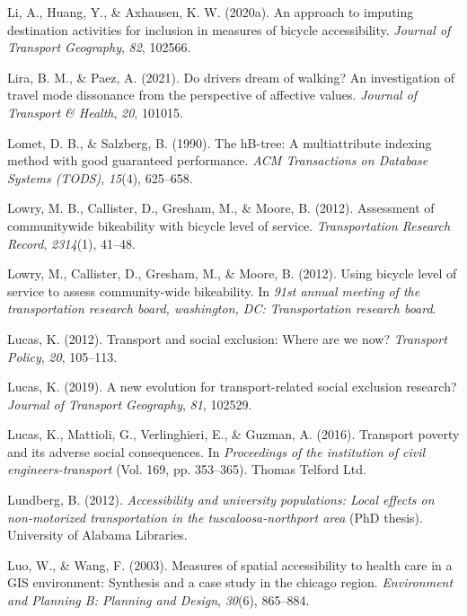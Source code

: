 \documentclass[
11pt, %
oneside, %
english, %
singlespacing, %
]{macthesis} %
\newlength{\cslhangindent}
\newenvironment{CSLReferences}[2] %
{\begin{list}{}{%
	\setlength{\itemindent}{0pt}
	\setlength{\leftmargin}{0pt}
	\setlength{\parsep}{0pt}
	\ifodd #1
	\setlength{\leftmargin}{\cslhangindent}
	\setlength{\itemindent}{-1\cslhangindent}
	\fi
	\setlength{\itemsep}{#2\baselineskip}}}
{\end{list}}
\begin{document}
\begin{CSLReferences}{1}{0}
Li, A., Huang, Y., \& Axhausen, K. W. (2020a). An approach to imputing destination activities for inclusion in measures of bicycle accessibility. \emph{Journal of Transport Geography}, \emph{82}, 102566.

Lira, B. M., \& Paez, A. (2021). Do drivers dream of walking? An investigation of travel mode dissonance from the perspective of affective values. \emph{Journal of Transport \& Health}, \emph{20}, 101015.

Lomet, D. B., \& Salzberg, B. (1990). The hB-tree: A multiattribute indexing method with good guaranteed performance. \emph{ACM Transactions on Database Systems (TODS)}, \emph{15}(4), 625--658.

Lowry, M. B., Callister, D., Gresham, M., \& Moore, B. (2012). Assessment of communitywide bikeability with bicycle level of service. \emph{Transportation Research Record}, \emph{2314}(1), 41--48.

Lowry, M., Callister, D., Gresham, M., \& Moore, B. (2012). Using bicycle level of service to assess community-wide bikeability. In \emph{91st annual meeting of the transportation research board, washington, DC: Transportation research board}.

Lucas, K. (2012). Transport and social exclusion: Where are we now? \emph{Transport Policy}, \emph{20}, 105--113.

Lucas, K. (2019). A new evolution for transport-related social exclusion research? \emph{Journal of Transport Geography}, \emph{81}, 102529.

Lucas, K., Mattioli, G., Verlinghieri, E., \& Guzman, A. (2016). Transport poverty and its adverse social consequences. In \emph{Proceedings of the institution of civil engineers-transport} (Vol. 169, pp. 353--365). Thomas Telford Ltd.

Lundberg, B. (2012). \emph{Accessibility and university populations: Local effects on non-motorized transportation in the tuscaloosa-northport area} (PhD thesis). University of Alabama Libraries.

Luo, W., \& Wang, F. (2003). Measures of spatial accessibility to health care in a GIS environment: Synthesis and a case study in the chicago region. \emph{Environment and Planning B: Planning and Design}, \emph{30}(6), 865--884.


\end{CSLReferences}
\end{document}
